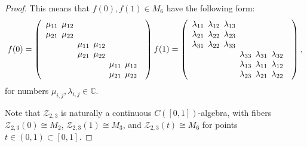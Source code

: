 \documentclass{amsart}
\theoremstyle{definition}
\begin{document}
\begin{proof}
    This means that $f(0),f(1)\in M_6$ have the following form:
    \begin{align*}
        f(0) = \left(\begin{array}{p{9pt}p{9pt}p{9pt}p{9pt}p{9pt}p{9pt}p{0pt}}
            $\mu_{11}$ & $\mu_{12}$ & \\
            $\mu_{21}$ & $\mu_{22}$ & \\
            & & $\mu_{11}$ & $\mu_{12}$ & \\
            & & $\mu_{21}$ & $\mu_{22}$ & \\
            & & & & $\mu_{11}$ & $\mu_{12}$ & \\
            & & & & $\mu_{21}$ & $\mu_{22}$ & \\
        \end{array}\right)
        f(1) = \left(\begin{array}{p{9pt}p{9pt}p{9pt}p{9pt}p{9pt}p{9pt}p{0pt}}
            $\lambda_{11}$ & $\lambda_{12}$ & $\lambda_{13}$ & \\
            $\lambda_{21}$ & $\lambda_{22}$ & $\lambda_{23}$ & \\
            $\lambda_{31}$ & $\lambda_{22}$ & $\lambda_{33}$ & \\
            & & & $\lambda_{33}$ & $\lambda_{31}$ & $\lambda_{32}$ & \\
            & & & $\lambda_{13}$ & $\lambda_{11}$ & $\lambda_{12}$ & \\
            & & & $\lambda_{23}$ & $\lambda_{21}$ & $\lambda_{22}$ & \\
        \end{array}\right),
    \end{align*}
    for numbers $\mu_{i,j},\lambda_{i,j}\in{{\mathbb{C}}}$.

    Note that $\mathcal{Z}_{2,3}$ is naturally a continuous $C([0,1])$-algebra, with fibers $\mathcal{Z}_{2,3}(0)\cong M_2$, $\mathcal{Z}_{2,3}(1)\cong M_3$, and $\mathcal{Z}_{2,3}(t)\cong M_6$ for points $t\in (0,1)\subset[0,1]$.


\end{proof}
\end{document}
